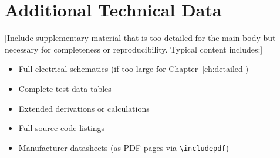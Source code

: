\chapter{Additional Technical Data}
\label{app:technical}

[Include supplementary material that is too detailed for the main
body but necessary for completeness or reproducibility. Typical
content includes:]

\begin{itemize}
    \item Full electrical schematics (if too large for Chapter~\ref{ch:detailed})
    \item Complete test data tables
    \item Extended derivations or calculations
    \item Full source-code listings
    \item Manufacturer datasheets (as PDF pages via \texttt{\textbackslash includepdf})
\end{itemize}

% 

